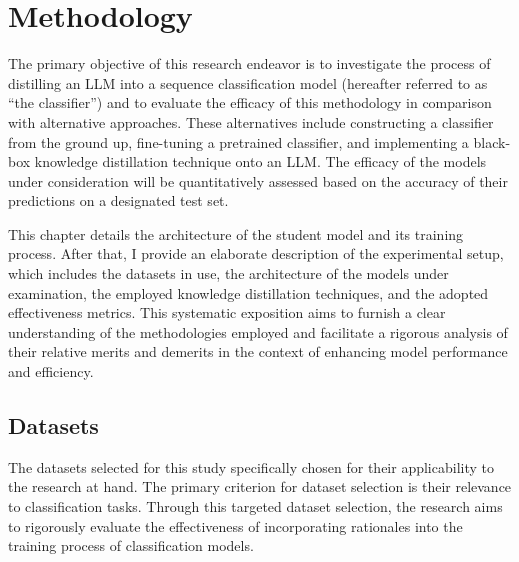 \chapter{Methodology}
\label{chap:met}

The primary objective of this research endeavor is to investigate the process of distilling an LLM into a sequence classification model (hereafter referred to as ``the classifier'') and to evaluate the efficacy of this methodology in comparison with alternative approaches. These alternatives include constructing a classifier from the ground up, fine-tuning a pretrained classifier, and implementing a black-box knowledge distillation technique onto an LLM\@. The efficacy of the models under consideration will be quantitatively assessed based on the accuracy of their predictions on a designated test set.

This chapter details the architecture of the student model and its training process. After that, I provide an elaborate description of the experimental setup, which includes the datasets in use, the architecture of the models under examination, the employed knowledge distillation techniques, and the adopted effectiveness metrics. This systematic exposition aims to furnish a clear understanding of the methodologies employed and facilitate a rigorous analysis of their relative merits and demerits in the context of enhancing model performance and efficiency.


\section{Datasets}
\label{sec:datasets}

The datasets selected for this study specifically chosen for their applicability to the research at hand. The primary criterion for dataset selection is their relevance to classification tasks. Through this targeted dataset selection, the research aims to rigorously evaluate the effectiveness of incorporating rationales into the training process of classification models.

